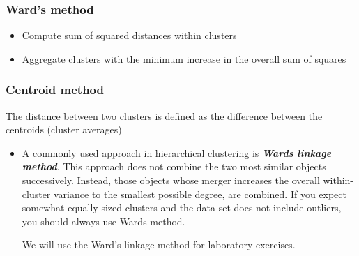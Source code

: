 \documentclass[a4paper,12pt]{article}
\begin{document}
\subsubsection{Ward's method}
\begin{itemize}
	\item  Compute sum of squared distances within clusters
	\item  Aggregate clusters with the minimum increase in the
	overall sum of squares
\end{itemize}
\subsubsection{Centroid method}
The distance between two clusters is defined as the
difference between the centroids (cluster averages)

\begin{itemize}

\item A commonly used approach in hierarchical clustering is \textbf{\textit{Wards linkage method}}.
This approach does not combine the two most similar objects successively. Instead,
those objects whose merger increases the overall within-cluster variance to the
smallest possible degree, are combined. If you expect somewhat equally sized
clusters and the data set does not include outliers, you should always use Wards
method.

We will use the Ward's linkage method for laboratory exercises.



\end{itemize}
\end{document}

